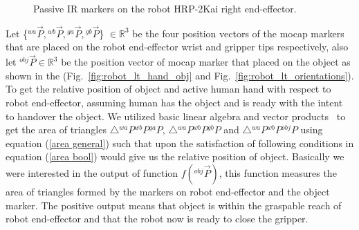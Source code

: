 \begin{figure}[ht]
	\caption{Passive IR markers on the robot HRP-2Kai right end-effector.}
	\label{fig:markerEf}
\end{figure} 


Let \{${}^{wa}\vec P, {}^{wb}\vec P, {}^{ga}\vec P, {}^{gb}\vec P$\} $\in \mathbb{R}^{3}$ be the four position vectors of the mocap markers that are placed on the robot end-effector wrist and gripper tips respectively, also let ${}^{obj}\vec P\in \mathbb{R}^{3}$ be the position vector of mocap marker that placed on the object as shown in the (Fig.~\ref{fig:robot_lt_hand_obj} and Fig.~\ref{fig:robot_lt_orientations}). To get the relative position of object and active human hand with respect to robot end-effector, assuming human has the object and is ready with the intent to handover the object. We utilized basic linear algebra and vector products~\cite{brand1947vector, crowe1994history, artin2016geometric} to get the area of triangles $\triangle{{}^{wa}P {}^{wb}P {}^{ga}P}$, $\triangle{{}^{wa}P {}^{wb}P {}^{gb}P}$ and $\triangle{{}^{wa}P {}^{wb}P {}^{obj}P}$ using equation (\ref{area general}) such that upon the satisfaction of following conditions in equation (\ref{area bool}) would give us the relative position of object. Basically we were interested in the output of function $f({}^{obj}\vec{P})$, this function measures the area of triangles formed by the markers on robot end-effector and the object marker. The positive output means that object is within the graspable reach of robot end-effector and that the robot now is ready to close the gripper.


